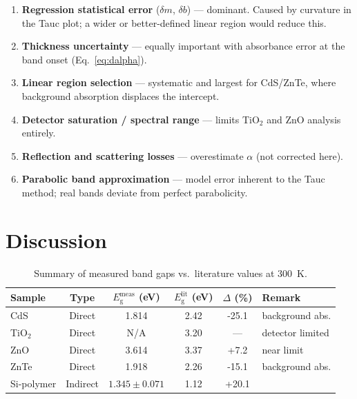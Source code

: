 \documentclass[12pt,a4paper]{article}
\newcommand{\Eg}{E_{\mathrm{g}}}
\begin{document}
\begin{enumerate}
  \item \textbf{Regression statistical error} ($\delta m$, $\delta b$) — dominant.
        Caused by curvature in the Tauc plot; a wider or better-defined linear region
        would reduce this.
  \item \textbf{Thickness uncertainty} — equally important with absorbance error
        at the band onset (Eq.~\eqref{eq:dalpha}).
  \item \textbf{Linear region selection} — systematic and largest for CdS/ZnTe,
        where background absorption displaces the intercept.
  \item \textbf{Detector saturation / spectral range} — limits TiO$_2$ and ZnO
        analysis entirely.
  \item \textbf{Reflection and scattering losses} — overestimate $\alpha$
        (not corrected here).
  \item \textbf{Parabolic band approximation} — model error inherent to the Tauc
        method; real bands deviate from perfect parabolicity.
\end{enumerate}

\section{Discussion}

\begin{table}[htbp]
  \centering
  \caption{Summary of measured band gaps vs.\ literature values at \SI{300}{K}.}
  \label{tab:summary}
  \begin{tabular}{lccc S[table-format=+3.1] l}
    \toprule
    Sample & Type & $\Eg^{\mathrm{meas}}$ (eV) & $\Eg^{\mathrm{lit}}$ (eV)
           & {$\Delta$ (\%)} & Remark \\
    \midrule
    CdS     & Direct   & 1.814 & 2.42\cite{Hummel2001} & -25.1 & background abs. \\
    TiO$_2$ & Direct   & N/A   & 3.20\cite{Hummel2001} & {—}   & detector limited \\
    ZnO     & Direct   & 3.614 & 3.37\cite{Hummel2001} & +7.2  & near limit \\
    ZnTe    & Direct   & 1.918 & 2.26\cite{Hummel2001} & -15.1 & background abs. \\
    Si-polymer & Indirect & $1.345\pm0.071$ & 1.12\cite{Hummel2001} & +20.1 & \\
    \bottomrule
  \end{tabular}
\end{table}
\end{document}
